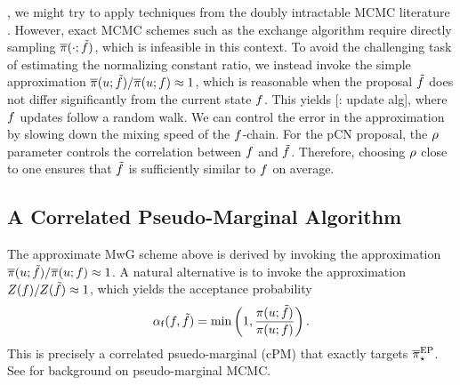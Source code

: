 \documentclass[12pt]{article}
\begin{document}
, we might try to apply techniques from the doubly 
intractable MCMC literature \citep{doublyIntractableReview}. However, exact 
MCMC schemes such as the exchange algorithm \citep{exchangeAlg} require 
directly sampling $\overline{\pi}(\cdot; \tilde{f})$,
which is infeasible in this context. To avoid the challenging task of estimating the 
normalizing constant ratio, we instead invoke the simple approximation 
$\overline{\pi}(u; \tilde{f}) / \overline{\pi}(u; f) \approx 1$, 
which is reasonable when the proposal $\tilde{f}$ does not differ significantly 
from the current state $f$. This yields  [\todo: update alg], 
where $f$ updates follow a random walk.
We can control the error in the approximation by 
slowing down the mixing speed of the $f$-chain. For the pCN proposal,
the $\rho$ parameter controls the correlation between $f$ and 
$\tilde{f}$. Therefore, choosing $\rho$ close to one ensures that
$\tilde{f}$ is sufficiently similar to $f$ on average. 

\subsection{A Correlated Pseudo-Marginal Algorithm}
The approximate MwG scheme above is derived by invoking the approximation 
$\overline{\pi}(u; \tilde{f}) / \overline{\pi}(u; f) \approx 1$.
A natural alternative is to invoke the approximation 
$Z(f) / Z(\tilde{f}) \approx 1$,
which yields the acceptance probability
\begin{equation}
\alpha_{\mathsf{f}}(f, \tilde{f})
= \min\left(1, \frac{\pi(u; \tilde{f})}{\pi(u; f)}\right).
\label{eq:MH-ratio-cpm}
\end{equation}
This is precisely a correlated psuedo-marginal (cPM) that exactly targets ${\overline{\pi}}_{\star}^{\mathrm{EP}}$.
See \citet{pseudoMarginalMCMC,pseudoMarginalEfficiency,corrPM}
for background on pseudo-marginal MCMC.
 
\end{document}
